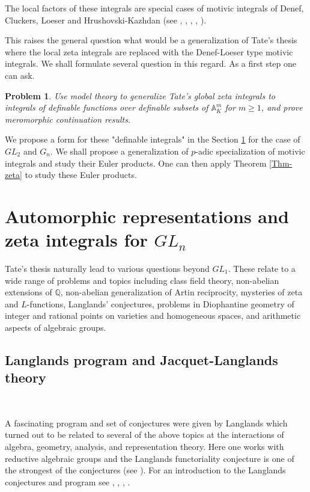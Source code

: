 \documentclass[12pt]{amsart}
\def\A{\mathbb{A}}
\def\Q{\mathbb{Q}}
\numberwithin{equation}{section}
\newtheorem{prob}{Problem}[section]
\begin{document}
The local factors of these integrals are special cases of motivic integrals of Denef, Cluckers, Loeser and Hrushovski-Kazhdan (see \cite{Denefrationality}, \cite{DL}, \cite{CL1}, \cite{CL2}, \cite{HK}).

This raises the general question what would be a generalization of Tate's thesis where the local zeta integrals are replaced with the Denef-Loeser type motivic integrals. We shall formulate several question in this regard. 
As a first step one can ask.

\begin{prob}Use model theory to generalize Tate's global zeta integrals to integrals of definable functions over definable subsets of $\A_K^m$ for $m\geq 1$, and prove meromorphic continuation results.\end{prob}
We propose a form for these "definable integrals" in the Section \ref{ssec-lang} for the case of $GL_2$ and $G_n$.
We shall propose a generalization of $p$-adic specialization of motivic integrals and study their Euler products. One can then apply Theorem \ref{Thm-zeta} to study these Euler products.

\section{\bf Automorphic representations and zeta integrals for $GL_n$}\label{ssec-lang}

Tate's thesis naturally lead to various questions beyond $GL_1$. These relate to a wide range of problems and topics including class field theory, non-abelian extensions of $\Q$, non-abelian generalization of 
Artin reciprocity, mysteries of zeta and $L$-functions, Langlands' conjectures, problems in Diophantine geometry of integer and rational points on varieties and homogeneous spaces, and arithmetic aspects of algebraic groups. 

\medskip

\subsection{\bf Langlands program and Jacquet-Langlands theory}\label{ssec-jl}

\

\medskip

A fascinating program and set of conjectures were given by Langlands which turned out to be related to several of the above topics at the interactions of algebra, geometry, analysis, and representation theory. Here one works with reductive algebraic groups and the Langlands functoriality conjecture is one of the strongest of the conjectures (see \cite{lang-prob}). 
For an introduction to the Langlands conjectures and program see \cite{lang-prob}, \cite{lang-icm}, \cite{lang-jer}, \cite{bump}. 
\end{document}
